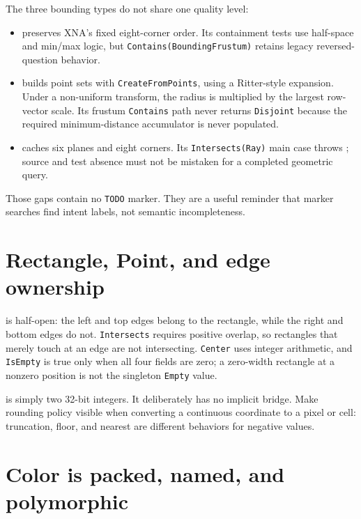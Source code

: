 The three bounding types do not share one quality level:

\begin{itemize}
  \item {} preserves XNA's fixed eight-corner order.  Its
        containment tests use half-space and min/max logic, but
        \texttt{Contains(BoundingFrustum)} retains legacy reversed-question behavior.
  \item {} builds point sets with \texttt{CreateFromPoints}, using a
        Ritter-style expansion. Under a non-uniform
        transform, the radius is multiplied by the largest row-vector scale.  Its frustum
        \texttt{Contains} path never returns \texttt{Disjoint} because the
        required minimum-distance accumulator is never populated.
  \item {} caches six planes and eight corners.  Its
        \texttt{Intersects(Ray)} main case throws ; source and
        test absence must not be mistaken for a completed geometric query.
\end{itemize}

Those gaps contain no \texttt{TODO} marker.  They are a useful reminder that marker searches find
intent labels, not semantic incompleteness.

\section{Rectangle, Point, and edge ownership}

 is half-open: the left and top edges belong to the rectangle, while
the right and bottom edges do not.  \texttt{Intersects} requires positive overlap, so rectangles
that merely touch at an edge are not intersecting.  \texttt{Center} uses integer arithmetic, and
\texttt{IsEmpty} is true only when all four fields are zero; a zero-width rectangle at a nonzero
position is not the singleton \texttt{Empty} value.

 is simply two 32-bit integers.  It deliberately has no implicit
 bridge.  Make rounding policy visible when converting a continuous coordinate to
a pixel or cell: truncation, floor, and nearest are different behaviors for negative values.

\section{Color is packed, named, and polymorphic}


